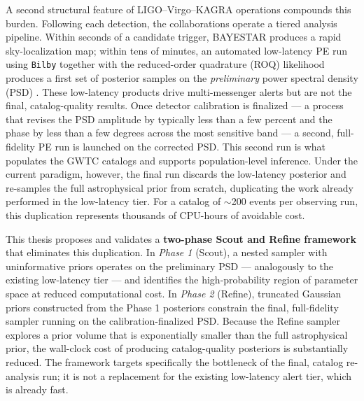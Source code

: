 \documentclass[12pt]{article}
\begin{document}
A second structural feature of LIGO–Virgo–KAGRA operations compounds this burden. Following each detection, the collaborations operate a tiered analysis pipeline. Within seconds of a candidate trigger, BAYESTAR produces a rapid sky-localization map; within tens of minutes, an automated low-latency PE run using \texttt{Bilby} together with the reduced-order quadrature (ROQ) likelihood produces a first set of posterior samples on the \textit{preliminary} power spectral density (PSD) \cite{Chaudhary2024, Bilby: A user-friendly, Smith2016}. These low-latency products drive multi-messenger alerts but are not the final, catalog-quality results. Once detector calibration is finalized — a process that revises the PSD amplitude by typically less than a few percent and the phase by less than a few degrees across the most sensitive band \cite{Sun2020, Biscoveanu2020} — a second, full-fidelity PE run is launched on the corrected PSD. This second run is what populates the GWTC catalogs and supports population-level inference. Under the current paradigm, however, the final run discards the low-latency posterior and re-samples the full astrophysical prior from scratch, duplicating the work already performed in the low-latency tier. For a catalog of $\sim$200 events per observing run, this duplication represents thousands of CPU-hours of avoidable cost.

This thesis proposes and validates a \textbf{two-phase Scout and Refine framework} that eliminates this duplication. In \textit{Phase 1} (Scout), a nested sampler with uninformative priors operates on the preliminary PSD — analogously to the existing low-latency tier — and identifies the high-probability region of parameter space at reduced computational cost. In \textit{Phase 2} (Refine), truncated Gaussian priors constructed from the Phase 1 posteriors constrain the final, full-fidelity sampler running on the calibration-finalized PSD. Because the Refine sampler explores a prior volume that is exponentially smaller than the full astrophysical prior, the wall-clock cost of producing catalog-quality posteriors is substantially reduced. The framework targets specifically the bottleneck of the final, catalog re-analysis run; it is not a replacement for the existing low-latency alert tier, which is already fast.
\end{document}

